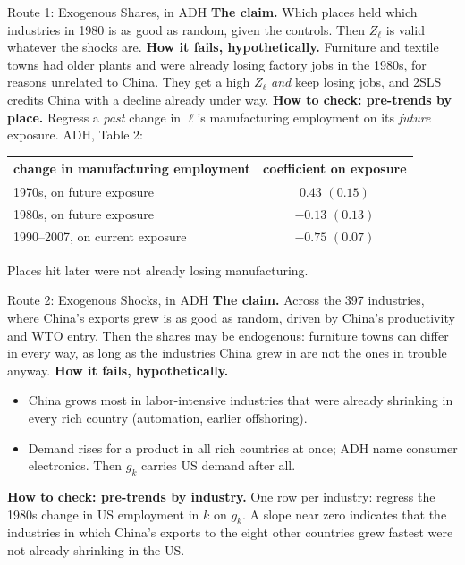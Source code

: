 \documentclass[aspectratio=169,11pt,xcolor=dvipsnames]{beamer}
\begin{document}
\begin{frame}{Route 1: Exogenous Shares, in ADH}
\textbf{The claim.} Which places held which industries in 1980 is as good as
random, given the controls. Then $Z_\ell$ is valid whatever the shocks are.
\vskip2pt
\textbf{How it fails, hypothetically.} Furniture and textile towns had older
plants and were already losing factory jobs in the 1980s, for reasons unrelated
to China. They get a high $Z_\ell$ \emph{and} keep losing jobs, and 2SLS
credits China with a decline already under way.
\vskip2pt
\textbf{How to check: pre-trends by place.} Regress a \emph{past} change in
$\ell$'s manufacturing employment on its \emph{future} exposure. ADH, Table 2:
\vskip-2pt
\begin{center}\footnotesize
\renewcommand{\arraystretch}{1.0}
\begin{tabular}{@{}lc@{}}
\toprule
change in manufacturing employment & coefficient on exposure \\
\midrule
1970s, on future exposure & $0.43$ $(0.15)$ \\
1980s, on future exposure & $-0.13$ $(0.13)$ \\
1990--2007, on current exposure & $-0.75$ $(0.07)$ \\
\bottomrule
\end{tabular}
\end{center}
Places hit later were not already losing manufacturing.
\end{frame}

\begin{frame}{Route 2: Exogenous Shocks, in ADH}
\textbf{The claim.} Across the 397 industries, where China's exports grew is as
good as random, driven by China's productivity and WTO entry. Then the shares
may be endogenous: furniture towns can differ in every way, as long as the
industries China grew in are not the ones in trouble anyway.
\vskip2pt
\textbf{How it fails, hypothetically.}
\begin{itemize}\itemsep0pt
  \item China grows most in labor-intensive industries that were already
        shrinking in every rich country (automation, earlier offshoring).
  \item Demand rises for a product in all rich countries at once; ADH name
        consumer electronics. Then $g_k$ carries US demand after all.
\end{itemize}
\vskip2pt
\textbf{How to check: pre-trends by industry.} One row per industry: regress
the 1980s change in US employment in $k$ on $g_k$. A slope near zero indicates
that the industries in which China's exports to the eight other countries grew
fastest were not already shrinking in the US.
\end{frame}
\end{document}
